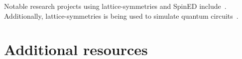 Notable research projects using lattice-symmetries and SpinED include~\cite{astrakhantsev2021,bagrov2020,sign_generalization}. Additionally, lattice-symmetries is being used to simulate quantum circuits~\cite{qsl2021}.

\section{Additional resources}

